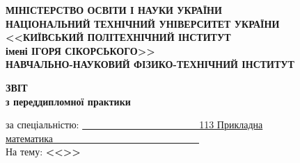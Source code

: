 \thispagestyle{empty}

    \begin{center}
        {\bfseries
            МІНІСТЕРСТВО ОСВІТИ І НАУКИ УКРАЇНИ \\
            НАЦІОНАЛЬНИЙ ТЕХНІЧНИЙ УНІВЕРСИТЕТ УКРАЇНИ \\
            <<КИЇВСЬКИЙ ПОЛІТЕХНІЧНИЙ ІНСТИТУТ \\
            імені ІГОРЯ СІКОРСЬКОГО>>\\
            НАВЧАЛЬНО-НАУКОВИЙ ФІЗИКО-ТЕХНІЧНИЙ ІНСТИТУТ\\
            \medskip
            \kafedra
        }
    \end{center}

    \vspace{15mm}

    \begin{center}
        {\bfseries\huge ЗВІТ} \\
        {\bfseries з переддипломної практики} \\
    \end{center}

    \vspace{5mm}

    \noindent за спеціальністю: \underline{~~~~~~~~~~~~~~~~~~~~~~~~113 Прикладна математика~~~~~~~~~~~~~~~~~~~~~~~~~~~~~~} \\

    \noindent На тему: \textbf{<<\reportTitle>>}

    \vspace{5mm}

